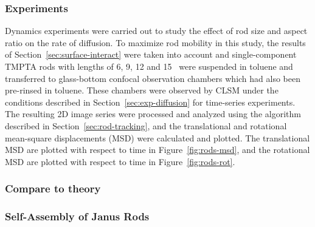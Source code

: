 

\subsubsection{Experiments}

Dynamics experiments were carried out to study the effect of rod size and aspect ratio on the rate of
diffusion.  To maximize rod mobility in this study, the results of Section~\ref{sec:surface-interact}
were taken into account and single-component TMPTA 
rods with lengths of 6, 9, 12 and 15 \microns~were suspended in toluene and transferred 
to glass-bottom confocal observation chambers which had 
also been
pre-rinsed in toluene.  These chambers were observed by CLSM under the conditions described in 
Section~\ref{sec:exp-diffusion} for time-series experiments.  The resulting 2D image series were 
processed and analyzed using the algorithm described in Section~\ref{sec:rod-tracking}, and 
the translational and rotational mean-square displacements (MSD) were calculated and plotted.
The translational MSD are plotted with respect to time in Figure~\ref{fig:rods-msd}, and the 
rotational MSD are plotted with respect to time in Figure~\ref{fig:rods-rot}.



\subsubsection{Compare to theory}

\subsubsection{Self-Assembly of Janus Rods}

